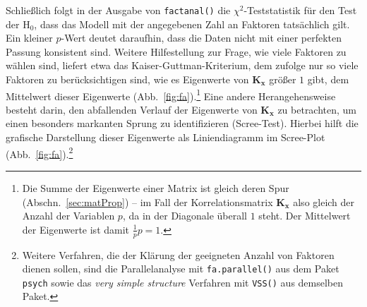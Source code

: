
Schließlich folgt in der Ausgabe von \lstinline!factanal()! die $\chi^{2}$-Teststatistik für den Test der $\text{H}_{0}$, dass das Modell mit der angegebenen Zahl an Faktoren tatsächlich gilt. Ein kleiner $p$-Wert deutet daraufhin, dass die Daten nicht mit einer perfekten Passung konsistent sind. Weitere Hilfestellung zur Frage, wie viele Faktoren zu wählen sind, liefert etwa das Kaiser-Guttman-Kriterium, dem zufolge nur so viele Faktoren zu berücksichtigen sind, wie es Eigenwerte von $\bm{K}_{\bm{x}}$ größer $1$ gibt, dem Mittelwert dieser Eigenwerte (Abb.\ \ref{fig:fa}).\footnote{Die Summe der Eigenwerte einer Matrix ist gleich deren Spur (Abschn.\ \ref{sec:matProp}) -- im Fall der Korrelationsmatrix $\bm{K}_{\bm{x}}$ also gleich der Anzahl der Variablen $p$, da in der Diagonale überall $1$ steht. Der Mittelwert der Eigenwerte ist damit $\frac{1}{p} p = 1$.} Eine andere Herangehensweise besteht darin, den abfallenden Verlauf der Eigenwerte von $\bm{K}_{\bm{x}}$ zu betrachten, um einen besonders markanten Sprung zu identifizieren (Scree-Test). Hierbei hilft die grafische Darstellung dieser Eigenwerte als Liniendiagramm im Scree-Plot (Abb.\ \ref{fig:fa}).\footnote{Weitere Verfahren, die der Klärung der geeigneten Anzahl von Faktoren dienen sollen, sind die Parallelanalyse mit \lstinline!fa.parallel()! aus dem Paket \lstinline!psych! sowie das \emph{very simple structure} Verfahren mit \lstinline!VSS()! aus demselben Paket.}

